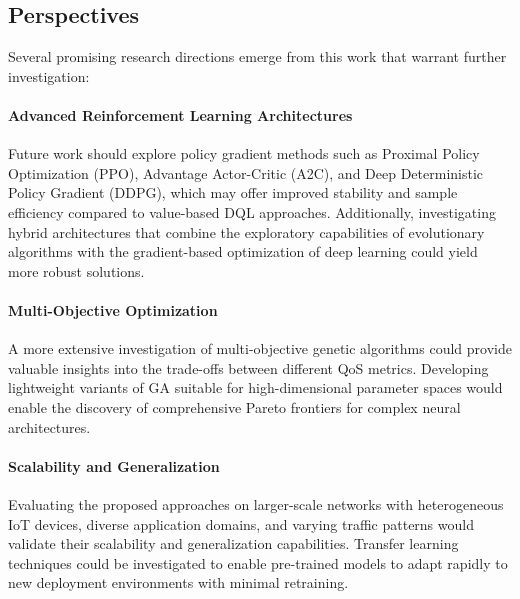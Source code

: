 \documentclass[preprint,3p,authoryear]{elsarticle}
\begin{document}
\subsection{Perspectives}

Several promising research directions emerge from this work that warrant further investigation:

\paragraph{Advanced Reinforcement Learning Architectures}
Future work should explore policy gradient methods such as Proximal Policy Optimization (PPO), Advantage Actor-Critic (A2C), and Deep Deterministic Policy Gradient (DDPG), which may offer improved stability and sample efficiency compared to value-based DQL approaches. Additionally, investigating hybrid architectures that combine the exploratory capabilities of evolutionary algorithms with the gradient-based optimization of deep learning could yield more robust solutions.

\paragraph{Multi-Objective Optimization}
A more extensive investigation of multi-objective genetic algorithms could provide valuable insights into the trade-offs between different QoS metrics. Developing lightweight variants of GA suitable for high-dimensional parameter spaces would enable the discovery of comprehensive Pareto frontiers for complex neural architectures.

\paragraph{Scalability and Generalization}
Evaluating the proposed approaches on larger-scale networks with heterogeneous IoT devices, diverse application domains, and varying traffic patterns would validate their scalability and generalization capabilities. Transfer learning techniques could be investigated to enable pre-trained models to adapt rapidly to new deployment environments with minimal retraining.


  
 
\end{document}
